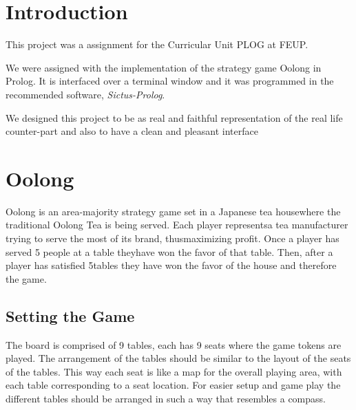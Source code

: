 \documentclass[a4paper]{article}
\begin{document}


\newpage

\section{Introduction}

This project was a assignment for the Curricular Unit PLOG at FEUP. \par
We were assigned with the implementation of the strategy game Oolong in Prolog.
It is interfaced over a terminal window and it was programmed in the recommended software,
 \textit{Sictus-Prolog}.
 \par
We designed this project to be as real and faithful representation of the real life counter-part and
also to have a clean and pleasant interface



\section{Oolong}
Oolong​ ​is​ ​an​ ​area-majority​ ​strategy​ ​game​ ​set​ ​in​ ​a​ ​Japanese​ ​tea​ ​house​ ​where​ ​the​ ​traditional
Oolong​ ​Tea​​ ​is​ ​being​ ​served.​ ​Each​ ​player​ ​represents​ ​a​ ​tea​ ​manufacturer​ ​trying​ ​to​ ​serve​ ​the​ ​most
of​ ​its​ ​brand,​ ​thus​ ​maximizing​ ​profit.​ ​Once​ ​a​ ​player​ ​has​ ​served​ ​5​ ​people​ ​at​ ​a​ ​table​ ​they​ ​have​ ​won
the​ ​favor​ ​of​ ​that​ ​table.​ ​Then,​ ​after​ ​a​ ​player​ ​has​ ​satisfied​ ​5​ ​tables​ ​they​ ​have​ ​won​ ​the​ ​favor​ ​of​ ​the
house​ ​and​ ​therefore​ ​the​ ​game.

\subsection{Setting​ ​the​ ​Game}
The board is comprised of 9 tables, each has 9 seats where the game tokens are played.
The arrangement of the tables should be similar to the layout of the seats of the tables. This way
each seat is like a map for the overall playing area, with each table corresponding to a seat
location. For easier setup and game play the different tables should be arranged in such a way that resembles a compass.
\end{document}
